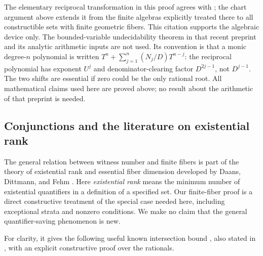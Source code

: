 \documentclass[11pt]{article}
\theoremstyle{definition}
\begin{document}
The elementary reciprocal transformation in this proof agrees with
\cite[Section 10.6, equation (10.8)]{Sun2026Rational86}; the chart argument
above extends it from the finite algebras explicitly treated there to all
constructible sets with finite geometric fibers. This citation supports
the algebraic device only. The bounded-variable undecidability theorem
in that recent preprint and its analytic arithmetic inputs are not used.
Its convention is that a monic degree-$n$ polynomial is written
$T^n+\sum_{j=1}^n(N_j/D)T^{n-j}$: the reciprocal polynomial has exponent
$U^j$ and denominator-clearing factor $D^{2j-1}$, not $D^{j-1}$.
The two shifts are essential if zero could be the only rational root.
All mathematical claims used here are proved above; no result about
the arithmetic of that preprint is needed.


\subsection{Conjunctions and the literature on existential rank}
\label{subsec:intersection-rank}

The general relation between witness number and finite fibers is part of
the theory of existential rank and essential fiber dimension developed
by Daans, Dittmann, and Fehm \cite[Corollary 4.21]{DDF2025}. Here
\emph{existential rank} means the minimum number of existential
quantifiers in a definition of a specified set. Our finite-fiber proof
is a direct constructive treatment of the special case needed here,
including exceptional strata and nonzero conditions. We make no claim
that the general quantifier-saving phenomenon is new.

For clarity, it gives the following useful known intersection bound
\cite[Theorem 1.4]{DDF2025}, also stated in
\cite[Theorem 2.5]{Daans2024}, with an explicit constructive proof over
the rationals.
\end{document}
